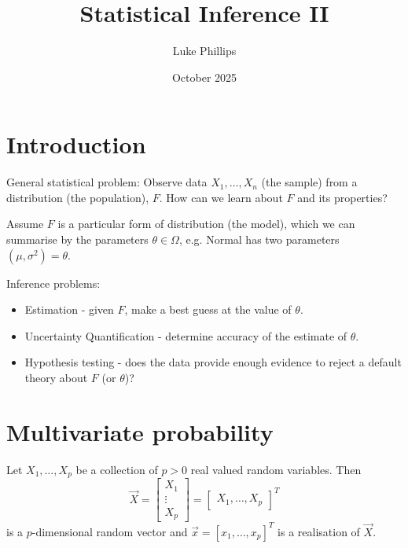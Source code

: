 \documentclass[10pt, a4paper]{article}
\title{Statistical Inference II}
\author{Luke Phillips}
\date{October 2025}
\begin{document}
\maketitle

\newpage

\tableofcontents

\newpage

\section{Introduction}

General statistical problem:
Observe data $X_1, \dotsc, X_n$
(the sample)
from a distribution
(the population),
$F$.
How can we learn about $F$ and its properties?

Assume $F$ is a particular form of distribution
(the model),
which we can summarise by the parameters $\theta \in \Omega$,
e.g. Normal has two parameters $(\mu, \sigma ^ 2) = \theta$.

Inference problems:
\begin{itemize}
    \item Estimation -
    given $F$,
    make a best guess at the value of $\theta$.
    
    \item Uncertainty Quantification -
    determine accuracy of the estimate of $\theta$.

    \item Hypothesis testing -
    does the data provide enough evidence to reject a default theory about $F$
    (or $\theta$)?
\end{itemize}

\newpage

\section{Multivariate probability}

\begin{definition}
    Let $X_1, \dotsc, X_p$ be a collection of $p > 0$ real valued random variables.
    Then
    \[
    \vec{X} = \begin{bmatrix}
        X_1 \\ \vdots \\ X_p
    \end{bmatrix} = \begin{bmatrix}
        X_1, \dotsc, X_p
    \end{bmatrix} ^ T
    \]
    is a $p$-dimensional random vector and $\vec{x} = [x_1, \dotsc, x_p] ^ T$ is a realisation of $\vec{X}$.
\end{definition}
\end{document}
